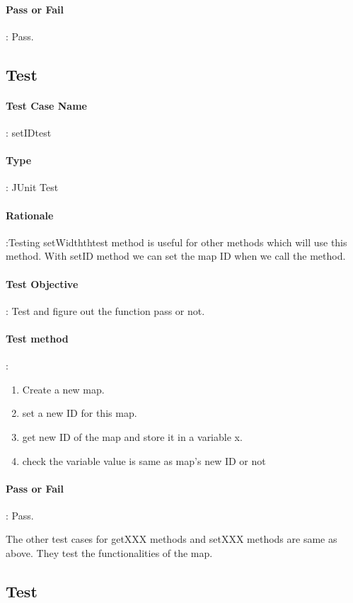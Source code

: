 \documentclass[12pt, a4paper]{report}
\begin{document}
\paragraph{Pass or Fail}: Pass.

\addtocounter{casecounter}{1}
\subsection{Test }
\paragraph{Test Case Name}: setIDtest
\paragraph{Type}: JUnit Test
\paragraph{Rationale}:Testing setWidththtest method is useful for other methods which will use this method. With setID method we can set the map ID when we call the method.
\paragraph{Test Objective}: Test and figure out the function pass or not.
\paragraph{Test method}: 
\begin{enumerate}
	\item Create a new map.
	\item set a new ID for this map.
	\item get new ID of the map and store it in a variable x.
	\item check the variable value is same as map's new ID or not
\end{enumerate}
\paragraph{Pass or Fail}: Pass.

The other test cases for getXXX methods and setXXX methods are same as above. They test the functionalities of the map.

\addtocounter{casecounter}{1}
\subsection{Test }
\end{document}
